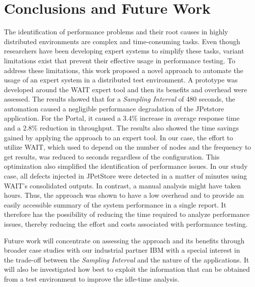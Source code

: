 \documentclass[runningheads,a4paper]{llncs}
\begin{document}
\vspace{-7pt}
\section{Conclusions and Future Work}
\label{Conclusions}
\vspace{-7pt}

The identification of performance problems and their root causes in highly
distributed environments are complex and time-consuming tasks. Even though
researchers have been developing expert systems to simplify these tasks, variant
limitations exist that prevent their effective usage in performance testing. To
address these limitations, this work proposed a novel approach to automate the usage of 
an expert system in a distributed test environment. A prototype was developed
around the WAIT expert tool and then its benefits and overhead were assessed.
The results showed that for a \emph{Sampling Interval} of 480 seconds, the automation
caused a negligible performance degradation of the JPetstore application. For the Portal,
it caused a 3.4\% increase in average response time and a 2.8\% reduction in
throughput. The results also showed the time savings gained by applying the
approach to an expert tool. In our case, the effort to utilize WAIT, which used
to depend on the number of nodes and the frequency to get results, was
reduced to seconds regardless of the configuration. This optimization also
simplified the identification of performance issues. In our study case, all
defects injected in JPetStore were detected in a matter of minutes using WAIT's consolidated 
outputs. In contrast, a manual analysis might have taken hours.
Thus, the approach was shown to have a low overhead and to provide an easily
accessible summary of the system performance in a single report. It therefore
has the possibility of reducing the time required to analyze performance issues,
thereby reducing the effort and costs associated with performance testing.

Future work will concentrate on assessing the approach and its benefits through
broader case studies with our industrial partner IBM with a special interest in 
the trade-off between the \emph{Sampling Interval} and the nature of the
applications.  It will also be investigated how best to exploit the information
that can be obtained from a test environment to improve the idle-time analysis.
\end{document}
